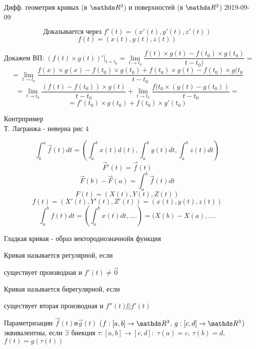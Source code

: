 \documentclass[main, 12pt, fleqn]{subfiles}
\begin{document}
\begin{lect} {Дифф. геометрия кривых (в $\R^3$) и поверхностей (в $\R^3$) 2019-09-09}
\begin{theorem} [свойства]
		\[\text{Доказывается через }f'(t) = (x'(t), y'(t), z'(t))\]
		\[f(t) = (x(t), y(t), z(t))\]

		\[\text{Докажем ВП: }(f(t) \times g(t))'|_{t = t_0} = \lim_{t \to t_0} \frac{f(t) \times g(t) - f(t_0) \times g(t_0)}{t - t_0)} = \]
		\[= \lim_{t \to t_0} \frac{f(x) \times g(x) - f(t_0) \times g(t_0) + f(t_0) \times g(t) - f(t_0) \times g(t_0}{t - t_0}\]
		\[= \lim_{t \to t_0} \frac{(f(t) - f(t_0)) \times g(t)}{t - t_0} + 
		\lim_{t \to t_0} \frac{f(t_0 \times (g(t) - g(t_0))}{t - t_0} = \]
		\[= f'(t_0) \times g(t_0) + f(t_0) \times g'(t_0)\]
\end{theorem}

\begin{example}
		Контрпример\\
		Т. Лагранжа  - неверна рис 4
\end{example}

\[\int_b^a \overrightarrow{f}(t) dt = (\int_a^b x(t)d(t), \int_a^b y(t)dt, \int_a^b z(t)dt) \]
\[\overrightarrow{F}'(t) = \overrightarrow{f}(t)\]
\[\overrightarrow{F}(b) - \overrightarrow{F}(a) = \int_a^b \overrightarrow{f}(t)dt\]
\[F(t) = (X(t), Y(t), Z(t))\]
\[f(t) = (X'(t), Y'(t), Z'(t)) = (x(t), y(t), z(t))\]
\[\int_a^b f(t)dt = (\int_a^b x(t) dt, ....) = (X(b) - X(a), ....\]

\begin{definition}
    Гладкая кривая - образ вектороднозначнойя функция
\end{definition}

\begin{definition}
    Кривая называется регулярной, если 
    
    существует производная и $f'(t) \neq \overrightarrow{0}$
\end{definition}

\begin{definition}
    Кривая называется бирегулярной, если 
    
    существует вторая производная и $f''(t) \not || f'(t)$
\end{definition}

\begin{definition}
    Параметризации $\overrightarrow{f}(t) и \overrightarrow{g}(t)$ ($f:[a,b] \rightarrow \R^3$, $g:[c,d] \rightarrow \R^3$) эквивалентны, если $\exists$ биекция $\tau: [a,b] \rightarrow [c,d]:$ $\tau(a)=c,\ \tau(b)=d$, $f(t)=g(\tau(t))$
\end{definition}


\end{lect}
\end{document}
